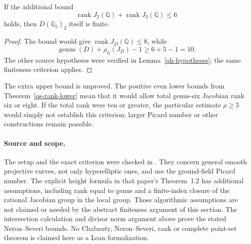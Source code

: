 \begin{proposition}
\label{qh-direct-conditional}
If the additional bound
\[
 \operatorname{rank}J_2(\mathbb Q)+\operatorname{rank}J_3(\mathbb Q)\le6
\]
holds, then \(D(\mathbb Q_5)_2\) itself is finite.
\end{proposition}
\begin{proof}
The bound would give \(\operatorname{rank}J_D(\mathbb Q)\le8\), while
\[
 \operatorname{genus}(D)+\rho_{\mathbb Q}(J_D)-1\ge6+5-1=10.
\]
The other source hypotheses were verified in Lemma~\ref{qh-hypotheses};
the same finiteness criterion applies.
\end{proof}
The extra upper bound is unproved. The positive even lower bounds from
Theorem~\ref{qs-rank-lower} mean that it would allow total genus-six
Jacobian rank six or eight. If the total rank were ten or greater,
the particular estimate \(\rho\ge5\) would simply not establish this
criterion; larger Picard number or other constructions remain possible.

\paragraph{Source and scope.}
The setup and the exact criterion were checked in
\cite[printed p.~3, Section~2, and Lemmas~3.1--3.2 on printed p.~12]{BalakrishnanDograQCI}.
They concern general smooth projective curves, not only hyperelliptic
ones, and use the ground-field Picard number. The explicit height formula
in that paper's Theorem~1.2 has additional assumptions, including
rank equal to genus and a finite-index closure of the rational Jacobian
group in the local group. Those algorithmic assumptions are not claimed
or needed by the abstract finiteness argument of this section. The
intersection calculation and divisor norm argument above prove the
stated Neron--Severi bounds. No Chabauty, Neron--Severi, rank or complete
point-set theorem is claimed here as a Lean formalization.
